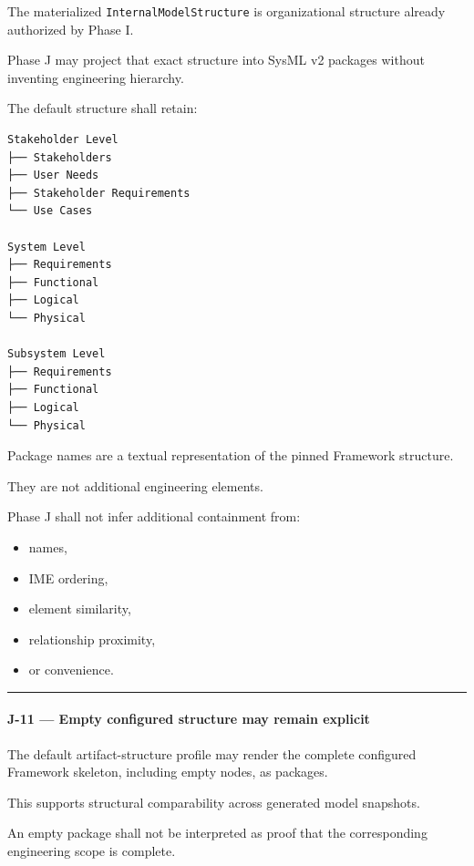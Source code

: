 The materialized \texttt{InternalModelStructure} is organizational structure already authorized by Phase I.

Phase J may project that exact structure into SysML v2 packages without inventing engineering hierarchy.

The default structure shall retain:

\begin{verbatim}
Stakeholder Level
├── Stakeholders
├── User Needs
├── Stakeholder Requirements
└── Use Cases

System Level
├── Requirements
├── Functional
├── Logical
└── Physical

Subsystem Level
├── Requirements
├── Functional
├── Logical
└── Physical
\end{verbatim}

Package names are a textual representation of the pinned Framework structure.

They are not additional engineering elements.

Phase J shall not infer additional containment from:

\begin{itemize}
\tightlist
\item
  names,
\item
  IME ordering,
\item
  element similarity,
\item
  relationship proximity,
\item
  or convenience.
\end{itemize}

\begin{center}\rule{0.5\linewidth}{0.5pt}\end{center}

\hypertarget{j-11--empty-configured-structure-may-remain-explicit}{%
\paragraph{J-11 --- Empty configured structure may remain explicit}\label{j-11--empty-configured-structure-may-remain-explicit}}

The default artifact-structure profile may render the complete configured Framework skeleton, including empty nodes, as packages.

This supports structural comparability across generated model snapshots.

An empty package shall not be interpreted as proof that the corresponding engineering scope is complete.

